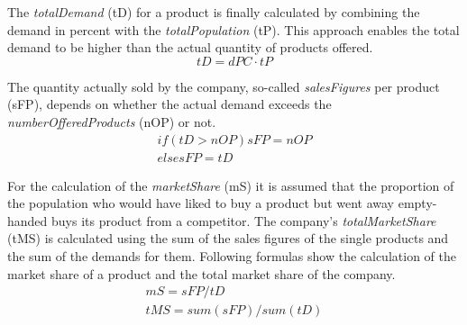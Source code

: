 The \textit{totalDemand} (\gls{tD}) for a product is finally calculated by combining the demand in percent with the \textit{totalPopulation} (\gls{tP}). This approach enables the total demand to be higher than the actual quantity of products offered.
\begin{equation}
\label{func:totalDemand}
tD= dPC \cdot tP    
\end{equation}

The quantity actually sold by the company, so-called \textit{salesFigures} per product (\gls{sFP}), depends on whether the actual demand exceeds the \textit{numberOfferedProducts} (\gls{nOP}) or not.
\begin{equation}
\label{func:salesFigure}
\begin{aligned}
if ( tD > nOP ) { sFP = nOP } \\
else { sFP = tD }    
\end{aligned}
\end{equation}

For the calculation of the \textit{marketShare} (\gls{mS}) it is assumed that the proportion of the population who would have liked to buy a product but went away empty-handed buys its product from a competitor. The company's \textit{totalMarketShare} (\gls{tMS}) is calculated using the sum of the sales figures of the single products and the sum of the demands for them. Following formulas show the calculation of the market share of a product and the total market share of the company.  
\begin{equation}
\label{func:marketShare}
\begin{aligned}
mS = sFP / tD \\
tMS = sum(sFP) / sum(tD)   
\end{aligned}
\end{equation}

